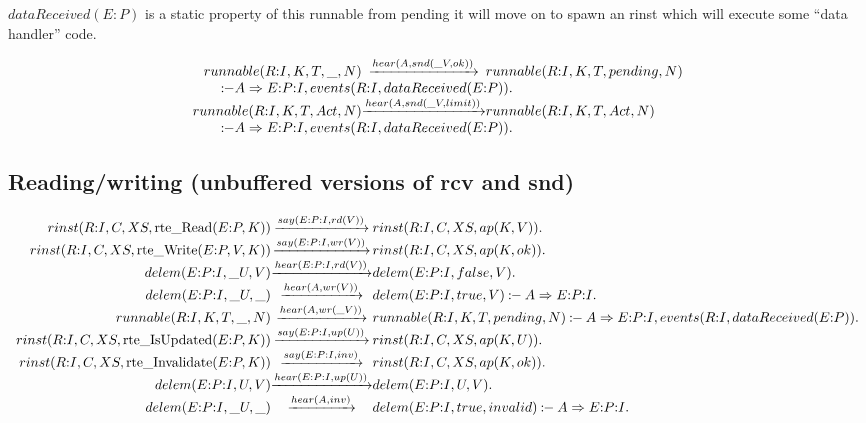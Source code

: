 \(dataReceived(E{:}P)\) is a static property of this runnable
  from pending it will move on to spawn an rinst which will execute some ``data handler'' code.

\[
\begin{array}{r@{}c@{}l}
  \Preduce{runnable(R{:}I, K, T, \_, N)} {hear(A,snd(\_V,ok))}   {runnable(R{:}I, K, T, pending, N)}
\\ \multicolumn{3}{l}{\qquad \Pif    A\Rightarrow{}E{:}P{:}I, events(R{:}I, dataReceived(E{:}P))    .}
\\\Preduce{runnable(R{:}I, K, T, Act, N)}{hear(A,snd(\_V,limit))}{runnable(R{:}I, K, T, Act, N)}
\\ \multicolumn{3}{l}{\qquad \Pif    A\Rightarrow{}E{:}P{:}I, events(R{:}I, dataReceived(E{:}P))    .}
\end{array}
\]


\subsection{Reading/writing (unbuffered versions of rcv and snd)}


\[
\begin{array}{r@{}c@{}l}
  \Preduce{rinst(R{:}I, C, XS, \rte{Read}(E{:}P,K))}       {say(E{:}P{:}I,rd(V))} {rinst(R{:}I, C, XS, ap(K,V))} .
\\\Preduce{rinst(R{:}I, C, XS, \rte{Write}(E{:}P,V,K))}    {say(E{:}P{:}I,wr(V))} {rinst(R{:}I, C, XS, ap(K,ok))}.
\\\Preduce{delem(E{:}P{:}I, \_U, V)}                       {hear(E{:}P{:}I,rd(V))}{delem(E{:}P{:}I, false, V)}        .
\\\Preduce{delem(E{:}P{:}I, \_U, \_)}                      {hear(A,wr(V))}        {delem(E{:}P{:}I, true, V)}            \Pif    A\Rightarrow{}E{:}P{:}I .
\\\Preduce{runnable(R{:}I, K, T, \_, N)}                   {hear(A,wr(\_V))}      {runnable(R{:}I, K, T, pending, N)}    \Pif    A\Rightarrow{}E{:}P{:}I, events(R{:}I, dataReceived(E{:}P))    .
\\\Preduce{rinst(R{:}I, C, XS, \rte{IsUpdated}(E{:}P,K))}  {say(E{:}P{:}I,up(U))} {rinst(R{:}I, C, XS, ap(K,U))} .
\\\Preduce{rinst(R{:}I, C, XS, \rte{Invalidate}(E{:}P,K))} {say(E{:}P{:}I,inv)}   {rinst(R{:}I, C, XS, ap(K,ok))}.
\\\Preduce{delem(E{:}P{:}I, U, V)}                         {hear(E{:}P{:}I,up(U))}{delem(E{:}P{:}I, U, V)} .
\\\Preduce{delem(E{:}P{:}I, \_U, \_)}                      {hear(A,inv)}          {delem(E{:}P{:}I, true, invalid)}      \Pif    A\Rightarrow{}E{:}P{:}I .
\end{array}
\]


